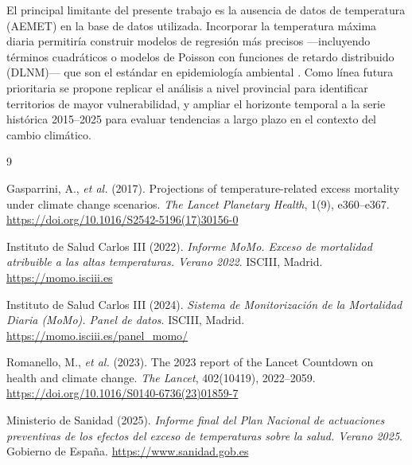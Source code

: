 \documentclass[11pt, a4paper]{article}
\begin{document}
El principal limitante del presente trabajo es la ausencia de datos de
temperatura (AEMET) en la base de datos utilizada. Incorporar la temperatura
máxima diaria permitiría construir modelos de regresión más precisos
—incluyendo términos cuadráticos o modelos de Poisson con funciones de retardo
distribuido (DLNM)— que son el estándar en epidemiología ambiental
\cite{gasparrini2017}. Como línea futura prioritaria se propone replicar
el análisis a nivel provincial para identificar territorios de mayor
vulnerabilidad, y ampliar el horizonte temporal a la serie histórica
2015--2025 para evaluar tendencias a largo plazo en el contexto del
cambio climático.


\begin{thebibliography}{9}

Gasparrini, A., \textit{et al.} (2017).
Projections of temperature-related excess mortality under climate change
scenarios. \textit{The Lancet Planetary Health}, 1(9), e360--e367.
\url{https://doi.org/10.1016/S2542-5196(17)30156-0}

Instituto de Salud Carlos III (2022).
\textit{Informe MoMo. Exceso de mortalidad atribuible a las altas
temperaturas. Verano 2022}. ISCIII, Madrid.
\url{https://momo.isciii.es}

Instituto de Salud Carlos III (2024).
\textit{Sistema de Monitorización de la Mortalidad Diaria (MoMo).
Panel de datos}. ISCIII, Madrid.
\url{https://momo.isciii.es/panel_momo/}

Romanello, M., \textit{et al.} (2023).
The 2023 report of the Lancet Countdown on health and climate change.
\textit{The Lancet}, 402(10419), 2022--2059.
\url{https://doi.org/10.1016/S0140-6736(23)01859-7}

Ministerio de Sanidad (2025).
\textit{Informe final del Plan Nacional de actuaciones preventivas de los
efectos del exceso de temperaturas sobre la salud. Verano 2025}.
Gobierno de España.
\url{https://www.sanidad.gob.es}

\end{thebibliography}
\end{document}
